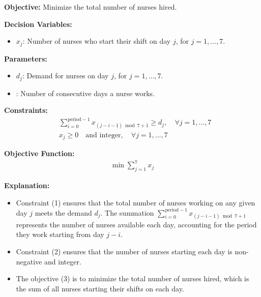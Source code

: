 \documentclass{article}
\begin{document}
\textbf{Objective:} Minimize the total number of nurses hired.

\textbf{Decision Variables:}
\begin{itemize}
    \item $x_j$: Number of nurses who start their shift on day $j$, for $j = 1, \ldots, 7$.
\end{itemize}

\textbf{Parameters:}
\begin{itemize}
    \item $d_j$: Demand for nurses on day $j$, for $j = 1, \ldots, 7$.
    \item {}: Number of consecutive days a nurse works.
\end{itemize}

\textbf{Constraints:}
\begin{align}
    &\sum_{i=0}^{\text{period}-1} x_{(j-i-1) \bmod 7 + 1} \geq d_j, \quad \forall j = 1, \ldots, 7 \\
    &x_j \geq 0 \quad \text{and integer}, \quad \forall j = 1, \ldots, 7
\end{align}

\textbf{Objective Function:}
\begin{align}
    \min \sum_{j=1}^{7} x_j
\end{align}

\textbf{Explanation:} 
\begin{itemize}
    \item Constraint (1) ensures that the total number of nurses working on any given day $j$ meets the demand $d_j$. The summation $\sum_{i=0}^{\text{period}-1} x_{(j-i-1) \bmod 7 + 1}$ represents the number of nurses available each day, accounting for the period they work starting from day $j-i$.
    \item Constraint (2) ensures that the number of nurses starting each day is non-negative and integer.
    \item The objective (3) is to minimize the total number of nurses hired, which is the sum of all nurses starting their shifts on each day.
\end{itemize}
\end{document}

